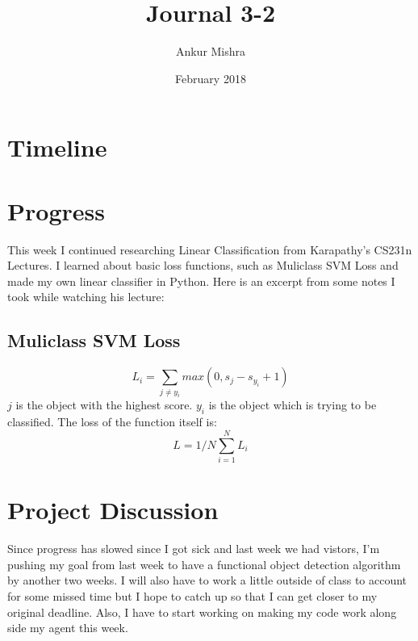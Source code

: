 \documentclass[11pt]{article}
\author{Ankur Mishra}
\date{February 2018}
\title{Journal 3-2}
\begin{document}
\maketitle
\tableofcontents

\section{Timeline}
\label{sec-1}
\section{Progress}
\label{sec-2}
This week I continued researching Linear Classification from Karapathy's CS231n Lectures. 
I learned about basic loss functions, such as Muliclass SVM Loss and made my own linear classifier in Python. Here is an excerpt from some notes I took 
while watching his lecture:
\subsection{Muliclass SVM Loss}
\label{sec-2-1}
\begin{equation}
L_i = \sum_{j \neq y_i} max(0, s_j - s_y_i + 1)
\end{equation}
$j$ is the object with the highest score. $y_i$ is the object which is trying to be classified.
The loss of the function itself is:
\begin{equation}
L = 1/N  \sum_{i=1}^{N} L_i
\end{equation}
\section{Project Discussion}
\label{sec-3}
Since progress has slowed since I got sick and last week we had vistors, I'm pushing my goal from last week to have a functional object detection algorithm 
by another two weeks. I will also have to work a little outside of class to account for some missed time but I hope to catch up so that I can get closer to my original deadline.
Also, I have to start working on making my code work along side my agent this week.
\end{document}
